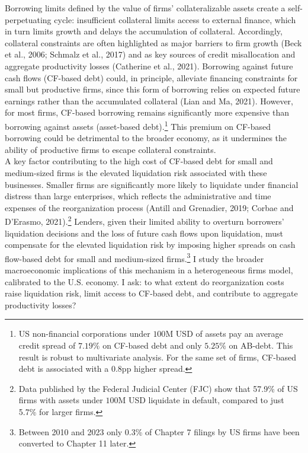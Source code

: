 \documentclass[12pt]{article}
\begin{document}
Borrowing limits defined by the value of firms' collateralizable assets create a self-perpetuating cycle: insufficient collateral limits access to external finance, which in turn limits growth and delays the accumulation of collateral. Accordingly, collateral constraints are often highlighted as major barriers to firm growth (Beck et al., 2006; Schmalz et al., 2017) and as key sources of credit misallocation and aggregate productivity losses (Catherine et al., 2021). Borrowing against future cash flows (CF-based debt) could, in principle, alleviate financing constraints for small but productive firms, since this form of borrowing relies on expected future earnings rather than the accumulated collateral (Lian and  Ma, 2021). However, for most firms, CF-based borrowing remains significantly more expensive than borrowing against assets (asset-based debt).\footnote{US non-financial corporations under $100$M USD of assets pay an average credit spread of $7.19\%$ on CF-based debt and only $5.25\%$ on AB-debt. This result is robust to multivariate analysis. For the same set of firms, CF-based debt is associated with a 0.8pp higher spread.} This premium on CF-based borrowing could be detrimental to the broader economy, as it undermines the ability of productive firms to escape collateral constraints.
\vspace{3mm}  \\
A key factor contributing to the high cost of CF-based debt for small and medium-sized firms is the elevated liquidation risk associated with these businesses. Smaller firms are significantly more likely to liquidate under financial distress than large enterprises, which reflects the administrative and time expenses of the reorganization process (Antill and Grenadier, 2019; Corbae and D'Erasmo, 2021).\footnote{Data published by the Federal Judicial Center (FJC) show that 57.9\% of US firms with assets under $100$M USD liquidate in default, compared to just 5.7\% for larger firms.} Lenders, given their limited ability to overturn borrowers' liquidation decisions and the loss of future cash flows upon liquidation, must compensate for the elevated liquidation risk by imposing higher spreads on cash flow-based debt for small and medium-sized firms.\footnote{Between 2010 and 2023 only 0.3\% of Chapter 7 filings by US firms have been converted to Chapter 11 later.} I study the broader macroeconomic implications of this mechanism in a heterogeneous firms model, calibrated to the U.S. economy. I ask: to what extent do reorganization costs raise liquidation risk, limit access to CF-based debt, and contribute to aggregate productivity losses? \vspace{3mm} \\
\end{document}
